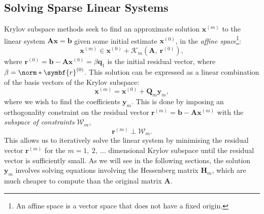 \documentclass{article}
\begin{document}
\subsection{Solving Sparse Linear Systems}
Krylov subspace methods seek to find an approximate solution
\(\symbf{x}^{\left( m \right)}\) to the linear system \(\symbf{A}
\symbf{x} = \symbf{b}\) given some initial estimate \(\symbf{x}^{\left(
0 \right)}\), in the \textit{affine space}\footnote{An affine space is
a vector space that does not have a fixed origin.}:
\begin{equation*}
    \symbf{x}^{\left( m \right)} \in \symbf{x}^{\left( 0 \right)} + \mathcal{K}_m\left( \symbf{A},\: \symbf{r}^{\left( 0 \right)} \right),
\end{equation*}
where \(\symbf{r}^{\left( 0 \right)} = \symbf{b} - \symbf{A} \symbf{x}^{\left( 0 \right)} = \beta \symbf{q}_1\)
is the initial residual vector, where \(\beta = \norm*{\symbf{r}^{\left( 0 \right)}}\).
This solution can be expressed as a linear combination of the basis
vectors of the Krylov subspace:
\begin{equation*}
    \symbf{x}^{\left( m \right)} = \symbf{x}^{\left( 0 \right)} + \symbf{Q}_m \symbf{y}_m,
\end{equation*}
where we wish to find the coefficients \(\symbf{y}_m\). This is done by
imposing an orthogonality constraint on the residual vector
\(\symbf{r}^{\left( m \right)} = \symbf{b} - \symbf{A} \symbf{x}^{\left( m \right)}\)
with the \textit{subspace of constraints} \(\mathcal{W}_m\),
\begin{equation*}
    \symbf{r}^{\left( m \right)} \perp \mathcal{W}_m.
\end{equation*}
This allows us to iteratively solve the linear system by minimising the
residual vector \(\symbf{r}^{\left( m \right)}\) for the \(m = 1,\: 2,\: \ldots\)
dimensional Krylov subspace until the residual vector is sufficiently
small. As we will see in the following sections, the solution \(\symbf{y}_m\)
involves solving equations involving the Hessenberg matrix \(\symbf{H}_m\),
which are much cheaper to compute than the original matrix \(\symbf{A}\).
\end{document}
